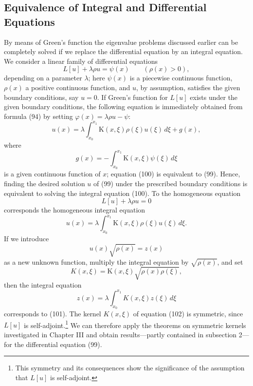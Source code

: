 \subsection{Equivalence of Integral and Differential Equations}
By means of Green's function the eigenvalue problems discussed earlier can be completely solved if we replace the differential equation by an integral equation. We consider a linear family of differential equations
\begin{equation}
L[u]+\lambda\rho u=\psi(x)\qquad(\rho(x)>0),
\tag{99}
\end{equation}
depending on a parameter $\lambda$; here $\psi(x)$ is a piecewise continuous function, $\rho(x)$ a positive continuous function, and $u$, by assumption, satisfies the given boundary conditions, say $u=0$. If Green's function for $L[u]$ exists under the given boundary conditions, the following equation is immediately obtained from formula (94) by setting $\varphi(x)=\lambda\rho u-\psi$:
\begin{equation}
u(x)=\lambda\int_{x_0}^{x_1}\mathrm K(x,\xi)\rho(\xi)u(\xi)\,d\xi+g(x),
\tag{100}
\end{equation}
where
\[
g(x)=-\int_{x_0}^{x_1}\mathrm K(x,\xi)\psi(\xi)\,d\xi
\]
is a given continuous function of $x$; equation (100) is equivalent to (99). Hence, finding the desired solution $u$ of (99) under the prescribed boundary conditions is equivalent to solving the integral equation (100). To the homogeneous equation
\begin{equation}
L[u]+\lambda\rho u=0
\tag{101}
\end{equation}
corresponds the homogeneous integral equation
\[
u(x)=\lambda\int_{x_0}^{x_1}\mathrm K(x,\xi)\rho(\xi)u(\xi)\,d\xi.
\]
If we introduce
\[
u(x)\sqrt{\rho(x)}=z(x)
\]
as a new unknown function, multiply the integral equation by $\sqrt{\rho(x)}$, and set
\[
K(x,\xi)=\mathrm K(x,\xi)\sqrt{\rho(x)\rho(\xi)},
\]
then the integral equation
\begin{equation}
z(x)=\lambda\int_{x_0}^{x_1}K(x,\xi)z(\xi)\,d\xi
\tag{102}
\end{equation}
corresponds to (101). The kernel $K(x,\xi)$ of equation (102) is symmetric, since $L[u]$ is self-adjoint.\footnote{This symmetry and its consequences show the significance of the assumption that $L[u]$ is self-adjoint.} We can therefore apply the theorems on symmetric kernels investigated in Chapter III and obtain results---partly contained in subsection 2---for the differential equation (99).

